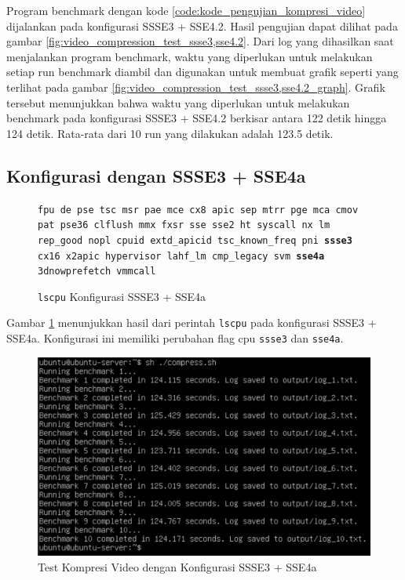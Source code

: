 Program benchmark dengan kode \ref{code:kode_pengujian_kompresi_video} dijalankan pada konfigurasi SSSE3 + SSE4.2. Hasil pengujian dapat dilihat pada gambar \ref{fig:video_compression_test_ssse3,sse4.2}. Dari log yang dihasilkan saat menjalankan program benchmark, waktu yang diperlukan untuk melakukan setiap run benchmark diambil dan digunakan untuk membuat grafik seperti yang terlihat pada gambar \ref{fig:video_compression_test_ssse3,sse4.2_graph}. Grafik tersebut menunjukkan bahwa waktu yang diperlukan untuk melakukan benchmark pada konfigurasi SSSE3 + SSE4.2 berkisar antara 122 detik hingga 124 detik. Rata-rata dari 10 run yang dilakukan adalah 123.5 detik.

\subsection{Konfigurasi dengan SSSE3 + SSE4a}
\begin{figure}
    \texttt{fpu de pse tsc msr pae mce cx8 apic sep mtrr pge mca cmov pat pse36 clflush mmx fxsr sse sse2 ht syscall nx lm rep\_good nopl cpuid extd\_apicid tsc\_known\_freq pni \textbf{ssse3} cx16 x2apic hypervisor lahf\_lm cmp\_legacy svm \textbf{sse4a} 3dnowprefetch vmmcall}
    \caption{\texttt{lscpu} Konfigurasi SSSE3 + SSE4a}
    \label{fig:lscpu_video_compression_test_ssse3,sse4a}
\end{figure}

Gambar \ref{fig:lscpu_video_compression_test_ssse3,sse4a} menunjukkan hasil dari perintah \texttt{lscpu} pada konfigurasi SSSE3 + SSE4a. Konfigurasi ini memiliki perubahan flag cpu \texttt{ssse3} dan \texttt{sse4a}.

\begin{figure}
    \centering
    \includegraphics[width=1\textwidth]
    {assets/pics/video-compression-test/ssse3,sse4a.jpeg}
    \caption{Test Kompresi Video dengan Konfigurasi SSSE3 + SSE4a}
    \label{fig:video_compression_test_ssse3,sse4a}
\end{figure}

